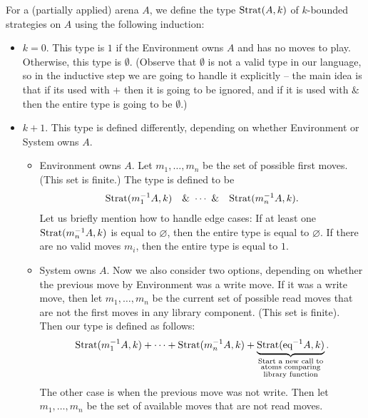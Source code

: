 \begin{definition}
    For a (partially applied) arena $A$, we define the type $\text{Strat}(A, k)$ of $k$-bounded strategies on $A$ using the following induction:
\begin{itemize}
    \item $k=0$. This type is $1$ if the Environment owns $A$ and has no moves to play. Otherwise, this type is $\emptyset$.
          (Observe that $\emptyset$ is not a valid type in our language, so in the inductive step we are going to handle it explicitly --
          the main idea is that if its used with $+$ then it is going to be ignored,
          and if it is used with $\&$ then the entire type is going to be $\emptyset$.) 
    \item $k + 1$. This type is defined differently, depending on whether Environment or System owns $A$.
    \begin{itemize}
        \item Environment owns $A$. Let $m_1,\ldots,m_n$ be the set of possible first moves. (This set is finite.) The type is defined to be 
        \begin{align*}
            \text{Strat}(m_1^{-1}A, k) \quad \&\  \cdots\  \& \quad  \text{Strat}(m_n^{-1}A, k).
        \end{align*}
        Let us briefly mention how to handle edge cases: If at least one $\text{Strat}(m_n^{-1}A, k)$ is equal to $\varnothing$, then 
        the entire type is equal to $\varnothing$. If there are no valid moves $m_i$, then the entire type is equal to $1$. 
        \item System owns $A$. Now we also consider two options, depending on whether the previous move by Environment was a write move. 
               If it was a write move, then let $m_1, \ldots, m_n$ be the current set of possible read moves that are not the first moves in any library 
               component. (This set is finite). Then our type is defined as follows:
               \begin{align*}
                \text{Strat}(m_1^{-1}A, k) + \cdots + \text{Strat}(m_n^{-1}A, k) + \underbrace{\text{Strat}({\text{eq}}^{-1}A, k)}_{\substack{\textrm{Start a new call to}\\
                \textrm{atoms comparing}\\
                \textrm{library function}}}.
               \end{align*}
               The other case is when the previous move was not write. Then let $m_1, \ldots, m_n$ be the set of available moves that are not read moves. 

\end{itemize}
\end{itemize}
\end{definition}
